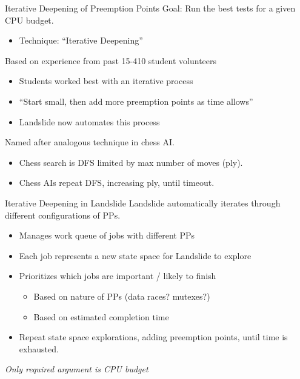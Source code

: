 \documentclass[xcolor=dvipsnames]{beamer}
\begin{document}
\begin{frame}{Iterative Deepening of Preemption Points}
	Goal: Run the best tests for a given CPU budget.
	\begin{itemize}
		\item Technique: ``Iterative Deepening''
	\end{itemize}
	\linegap

	Based on experience from past 15-410 student volunteers
	\begin{itemize}
		\item Students worked best with an iterative process
		\item ``Start small, then add more preemption points as time allows''
		\item Landslide now automates this process
	\end{itemize}
	\linegap

	Named after analogous technique in chess AI.
	\begin{itemize}
		\item Chess search is DFS limited by max number of moves (ply).
		\item Chess AIs repeat DFS, increasing ply, until timeout.
	\end{itemize}
\end{frame}

\begin{frame}{Iterative Deepening in Landslide}
	Landslide automatically iterates through different configurations of PPs.
	\begin{itemize}
		\item Manages work queue of jobs with different PPs
		\item Each job represents a new state space for Landslide to explore
		\item Prioritizes which jobs are important / likely to finish
		\begin{itemize}
			\item Based on nature of PPs (data races? mutexes?)
			\item Based on estimated completion time
		\end{itemize}
		\item Repeat state space explorations, adding preemption points, until time is exhausted.
	\end{itemize}

	\linegap
	{\em Only required argument is CPU budget}
\end{frame}
\end{document}
